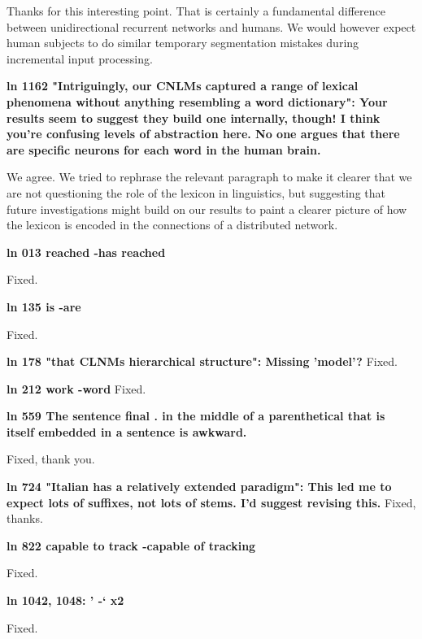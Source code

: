 \documentclass{article}[11pt,a4paper,oneside]
\begin{document}
Thanks for this interesting point. That is certainly a fundamental difference between unidirectional recurrent networks and humans. We would however expect human subjects to do similar temporary segmentation mistakes during incremental input processing.\newline

\textbf{ln 1162 "Intriguingly, our CNLMs captured a range of lexical phenomena
without anything resembling a word dictionary": Your results seem to
suggest they build one internally, though! I think you’re confusing
levels of abstraction here. No one argues that there are specific
neurons for each word in the human brain.}

We agree. We tried to rephrase the relevant paragraph to make it clearer that we are not questioning the role of the lexicon in linguistics, but suggesting that future investigations might build on our results to paint a clearer picture of how the lexicon is encoded in the connections of a distributed network.\newline

\textbf{ln 013 reached -has reached}

Fixed.\newline

\textbf{ln 135 is -are}

Fixed.\newline

\textbf{ln 178 "that CLNMs hierarchical structure": Missing 'model'?}
Fixed.\newline

\textbf{ln 212 work -word}
Fixed.\newline

\textbf{ln 559 The sentence final . in the middle of a parenthetical that is itself
embedded in a sentence is awkward.}

Fixed, thank you.\newline

\textbf{ln 724 "Italian has a relatively extended paradigm": This led me to expect
lots of suffixes, not lots of stems. I'd suggest revising this.}
Fixed, thanks.\newline

\textbf{ln 822 capable to track -capable of tracking}

Fixed.\newline

\textbf{ln 1042, 1048: ' -` x2}

Fixed.\newline
\end{document}

